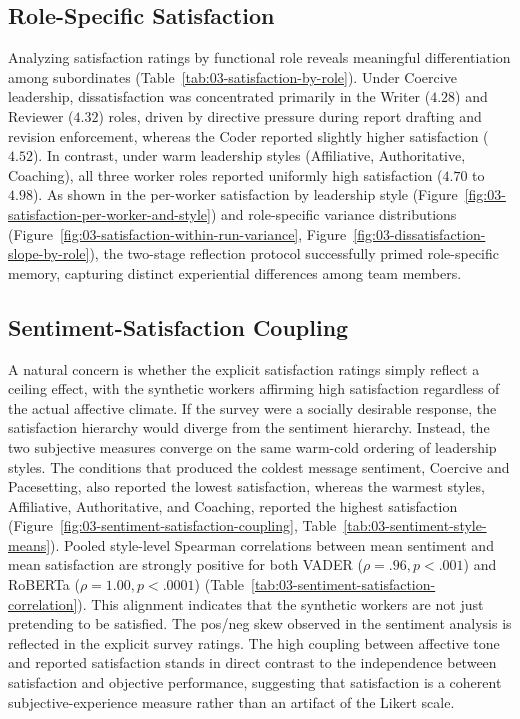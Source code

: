 \subsection{Role-Specific Satisfaction}
\label{subsec:role-specific-satisfaction}

Analyzing satisfaction ratings by functional role reveals meaningful differentiation among subordinates (Table~\ref{tab:03-satisfaction-by-role}).
Under Coercive leadership, dissatisfaction was concentrated primarily in the Writer ($4.28$) and Reviewer ($4.32$) roles, driven by directive pressure during report drafting and revision enforcement, whereas the Coder reported slightly higher satisfaction ($4.52$).
In contrast, under warm leadership styles (Affiliative, Authoritative, Coaching), all three worker roles reported uniformly high satisfaction ($4.70$ to $4.98$).
As shown in the per-worker satisfaction by leadership style (Figure~\ref{fig:03-satisfaction-per-worker-and-style}) and role-specific variance distributions (Figure~\ref{fig:03-satisfaction-within-run-variance}, Figure~\ref{fig:03-dissatisfaction-slope-by-role}), the two-stage reflection protocol successfully primed role-specific memory, capturing distinct experiential differences among team members.

\subsection{Sentiment-Satisfaction Coupling}
\label{subsec:sentiment-satisfaction-coupling}

A natural concern is whether the explicit satisfaction ratings simply reflect a ceiling effect, with the synthetic workers affirming high satisfaction regardless of the actual affective climate.
If the survey were a socially desirable response, the satisfaction hierarchy would diverge from the sentiment hierarchy.
Instead, the two subjective measures converge on the same warm-cold ordering of leadership styles.
The conditions that produced the coldest message sentiment, Coercive and Pacesetting, also reported the lowest satisfaction, whereas the warmest styles, Affiliative, Authoritative, and Coaching, reported the highest satisfaction (Figure~\ref{fig:03-sentiment-satisfaction-coupling}, Table~\ref{tab:03-sentiment-style-means}).
Pooled style-level Spearman correlations between mean sentiment and mean satisfaction are strongly positive for both \ac{VADER} ($\rho = .96, p < .001$) and \ac{RoBERTa} ($\rho = 1.00, p < .0001$) (Table~\ref{tab:03-sentiment-satisfaction-correlation}).
This alignment indicates that the synthetic workers are not just pretending to be satisfied. 
The pos/neg skew observed in the sentiment analysis is reflected in the explicit survey ratings.
The high coupling between affective tone and reported satisfaction stands in direct contrast to the independence between satisfaction and objective performance, suggesting that satisfaction is a coherent subjective-experience measure rather than an artifact of the Likert scale.

